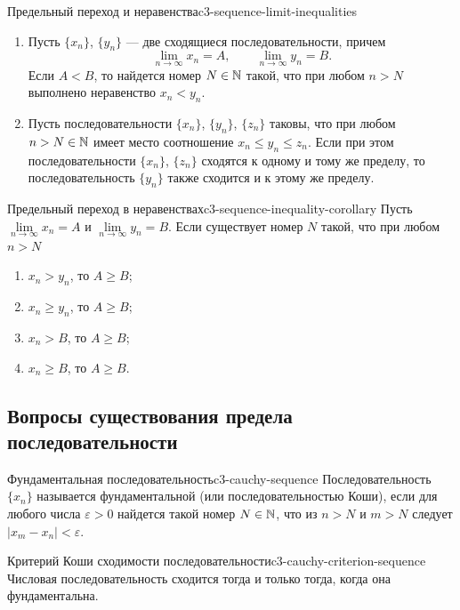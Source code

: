 \begin{theorem}{Предельный переход и неравенства}{c3-sequence-limit-inequalities}
  \begin{enumerate}[label=\alph*)]
    \item Пусть $\{x_n\}$, $\{y_n\}$ — две сходящиеся
      последовательности, причем
      \[
        \lim_{n\to\infty}x_n=A,
        \qquad
        \lim_{n\to\infty}y_n=B.
      \]
      Если $A<B$, то найдется номер $N\in\mathbb{N}$ такой, что при любом $n>N$
      выполнено неравенство $x_n<y_n$.
    \item Пусть последовательности $\{x_n\}$, $\{y_n\}$, $\{z_n\}$ таковы,
      что при любом $n>N\in\mathbb{N}$ имеет место соотношение
      $x_n\le y_n\le z_n$. Если при этом последовательности $\{x_n\}$,
      $\{z_n\}$ сходятся к одному и тому же пределу, то последовательность
      $\{y_n\}$ также сходится и к этому же пределу.
  \end{enumerate}
\end{theorem}

\begin{corollary}{Предельный переход в неравенствах}{c3-sequence-inequality-corollary}
  Пусть $\lim\limits_{n\to\infty}x_n=A$ и
  $\lim\limits_{n\to\infty}y_n=B$. Если существует номер $N$ такой, что
  при любом $n>N$
  \begin{enumerate}[label=\alph*)]
    \item $x_n>y_n$, то $A\ge B$;
    \item $x_n\ge y_n$, то $A\ge B$;
    \item $x_n>B$, то $A\ge B$;
    \item $x_n\ge B$, то $A\ge B$.
  \end{enumerate}
\end{corollary}

\subsection{Вопросы существования предела последовательности}

\begin{definition}{Фундаментальная последовательность}{c3-cauchy-sequence}
  Последовательность $\{x_n\}$ называется фундаментальной (или
  последовательностью Коши), если для любого числа $\varepsilon>0$ найдется
  такой номер $N\in\mathbb{N}$, что из $n>N$ и $m>N$ следует
  $|x_m-x_n|<\varepsilon$.
\end{definition}

\begin{theorem}{Критерий Коши сходимости последовательности}{c3-cauchy-criterion-sequence}
  Числовая последовательность сходится тогда и только тогда, когда она
  фундаментальна.
\end{theorem}

